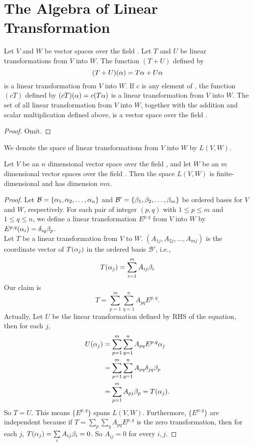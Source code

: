 \documentclass{mynotes}
\begin{document}
\section{The Algebra of Linear Transformation}
\begin{theorem}
Let $V$ and $W$ be vector spaces over the field \F. Let $T$ and $U$ be linear transformations from $V$ into $W$. The function $(T+U)$ defined by $$(T+U)(\alpha)=T\alpha+U\alpha$$is a linear transformation from $V$ into $W$. If $c$ is any element of \F, the function $(cT)$ defined by $(cT)(\alpha) = c(T\alpha)$ is a linear transformation from $V$ into $W$. The set of all linear transformation from $V$ into $W$, together with the addition and scalar multiplication defined above, is a vector space over the field \F.
\end{theorem}
\begin{proof}Omit.\end{proof}
\begin{remark}
We denote the space of linear transformations from $V$ into $W$ by $L(V,W)$.
\end{remark}
\begin{theorem}
Let $V$ be an $n$ dimensional vector space over the field \F, and let $W$ be an $m$ dimensional vector spaces over the field \F. Then the space $L(V,W)$ is finite-dimensional and has dimension $mn$.
\end{theorem}
\begin{proof}
Let $\mathcal{B} = \{\alpha_1,\alpha_2,\ldots,\alpha_n\}$ and $\mathcal{B}'= \{\beta_1,\beta_2,\ldots,\beta_m\}$ be ordered bases for $V$ and $W$, respectively. For each pair of integer $(p,q)$ with $1\leq p\leq m$ and $1\leq q\leq n$, we define a linear transformation $E^{p,q}$ from $V$ into $W$ by $E^{p,q}(\alpha_i) = \delta_{iq}\beta_p$.\\ Let $T$ be a linear transformation from $V$ to $W$. $(A_{1j},A_{2j},\ldots,A_{mj})$ is the coordinate vector of $T(\alpha_j)$ in the ordered basis $\mathcal{B}'$, i.e., $$T(\alpha_j) = \sum_{i=1}^mA_{ij}\beta_i$$ Our claim is $$T=\sum_{p=1}^m\sum_{q=1}^nA_{pq}E^{p,q}.$$Actually, Let $U$ be the linear transformation defined by RHS of the equation, then for each $j$, 
\begin{align*}U(\alpha_j) &= \sum_{p=1}^m\sum_{q=1}^nA_{pq}E^{p,q}\alpha_j\\ &= \sum_{p=1}^m\sum_{q=1}^nA_{pq}\delta_{jq}\beta_p\\ &=\sum_{p=1}^mA_{pj}\beta_p = T(\alpha_j).\end{align*}So $T=U.$ This means $\{E^{p,q}\}$ spans $L(V,W)$. Furthermore, $\{E^{p,q}\}$ are independent because if $T=\sum\limits_{p}\sum\limits_{q}A_{pq}E^{p,q}$ is the zero transformation, then for each $j$, $T(\alpha_j)= \sum\limits_iA_{ij}\beta_i=0$. So $A_{ij}=0$ for every $i,j$.
\end{proof}
\end{document}

